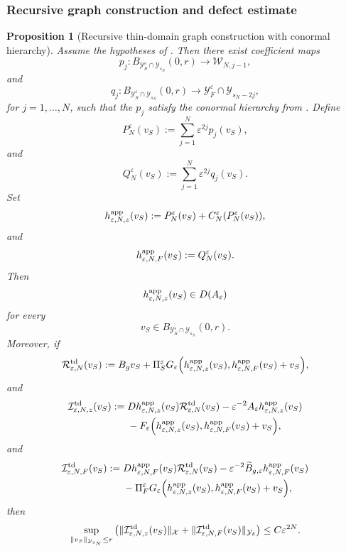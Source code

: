 \documentclass[11pt]{article}
\newtheorem{proposition}[theorem]{Proposition}
\theoremstyle{definition}
\theoremstyle{remark}
\numberwithin{equation}{section}
\begin{document}
\subsubsection*{Recursive graph construction and defect estimate}

\begin{proposition}[Recursive thin-domain graph construction with conormal hierarchy]
\label{prop:recursive-thin-domain-graph-construction-form}
Assume the hypotheses of
. Then there exist coefficient
maps
\[
p_j:
B_{\mathcal Y_S^\varepsilon\cap\mathcal Y_{s_N}}(0,r)
\to
\mathcal W_{N,j-1},
\]
and
\[
q_j:
B_{\mathcal Y_S^\varepsilon\cap\mathcal Y_{s_N}}(0,r)
\to
\mathcal Y_F^\varepsilon\cap\mathcal Y_{s_N-2j},
\]
for \(j=1,\dots,N\), such that the \(p_j\) satisfy the conormal hierarchy from
. Define
\[
P_N^\varepsilon(v_S)
:=
\sum_{j=1}^N\varepsilon^{2j} p_j(v_S),
\]
and
\[
Q_N^\varepsilon(v_S)
:=
\sum_{j=1}^N\varepsilon^{2j} q_j(v_S).
\]
Set
\[
h_{\varepsilon,N,z}^{\rm app}(v_S)
:=
P_N^\varepsilon(v_S)
+
C_N^\varepsilon(P_N^\varepsilon(v_S)),
\]
and
\[
h_{\varepsilon,N,F}^{\rm app}(v_S)
:=
Q_N^\varepsilon(v_S).
\]
Then
\[
h_{\varepsilon,N,z}^{\rm app}(v_S)\in D(A_\varepsilon)
\]
for every
\[
v_S\in B_{\mathcal Y_S^\varepsilon\cap\mathcal Y_{s_N}}(0,r).
\]
Moreover, if
\[
\mathcal R_{\varepsilon,N}^{\rm td}(v_S)
:=
B_gv_S
+
\Pi_S^\varepsilon
G_\varepsilon\Big(
h_{\varepsilon,N,z}^{\rm app}(v_S),
h_{\varepsilon,N,F}^{\rm app}(v_S)+v_S
\Big),
\]
and
\[
\begin{aligned}
\mathcal I_{\varepsilon,N,z}^{\rm td}(v_S)
:={}&
Dh_{\varepsilon,N,z}^{\rm app}(v_S)
\mathcal R_{\varepsilon,N}^{\rm td}(v_S)
-
\varepsilon^{-2}A_\varepsilon h_{\varepsilon,N,z}^{\rm app}(v_S)
\\
&-
F_\varepsilon\Big(
h_{\varepsilon,N,z}^{\rm app}(v_S),
h_{\varepsilon,N,F}^{\rm app}(v_S)+v_S
\Big),
\end{aligned}
\]
and
\[
\begin{aligned}
\mathcal I_{\varepsilon,N,F}^{\rm td}(v_S)
:={}&
Dh_{\varepsilon,N,F}^{\rm app}(v_S)
\mathcal R_{\varepsilon,N}^{\rm td}(v_S)
-
\varepsilon^{-2}\widetilde B_{g,\varepsilon}
h_{\varepsilon,N,F}^{\rm app}(v_S)
\\
&-
\Pi_F^\varepsilon
G_\varepsilon\Big(
h_{\varepsilon,N,z}^{\rm app}(v_S),
h_{\varepsilon,N,F}^{\rm app}(v_S)+v_S
\Big),
\end{aligned}
\]
then
\[
\sup_{\|v_S\|_{\mathcal Y_{s_N}}\le r}
\left(
\|\mathcal I_{\varepsilon,N,z}^{\rm td}(v_S)\|_{\mathcal X}
+
\|\mathcal I_{\varepsilon,N,F}^{\rm td}(v_S)\|_{\mathcal Y_\delta}
\right)
\le
C\varepsilon^{2N}.
\]
\end{proposition}
\end{document}
